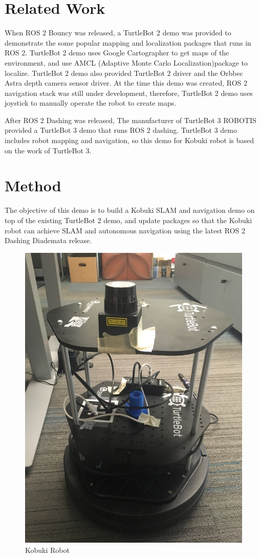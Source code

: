 \documentclass[letterpaper, 10 pt, conference]{ieeeconf}  %
\begin{document}
\section{Related Work}
When ROS 2 Bouncy was released, a TurtleBot 2 demo \cite{c10} was provided to demonstrate the some popular mapping and localization packages that runs in ROS 2. TurtleBot 2 demo uses Google Cartographer to get maps of the environment, and use AMCL (Adaptive Monte Carlo Localization)package to localize. TurtleBot 2 demo also provided TurtleBot 2 driver and the Orbbec Astra depth camera sensor driver. At the time this demo was created, ROS 2 navigation stack was still under development, therefore, TurtleBot 2 demo uses joystick to manually operate the robot to create maps. 
\par\vspace{3pt} 
After ROS 2 Dashing was released, The manufacturer of TurtleBot 3 ROBOTIS\cite{c5} provided a TurtleBot 3 demo that runs ROS 2 dashing. TurtleBot 3 demo includes robot mapping and navigation, so this demo for Kobuki robot is based on the work of TurtleBot 3. 
\section{Method}
The objective of this demo is to build a Kobuki SLAM and navigation demo on top of the existing TurtleBot 2 demo, and update packages so that the Kobuki robot can achieve SLAM and autonomous navigation using the latest ROS 2 Dashing Diademata release. 
 
\begin{figure}[ht]
  \centerline{\includegraphics[width=0.7\linewidth]{kobuki_robot.JPG}}
  \caption{Kobuki Robot} 
  \label{fig:Kobuki_image}
\end{figure}
\end{document}

